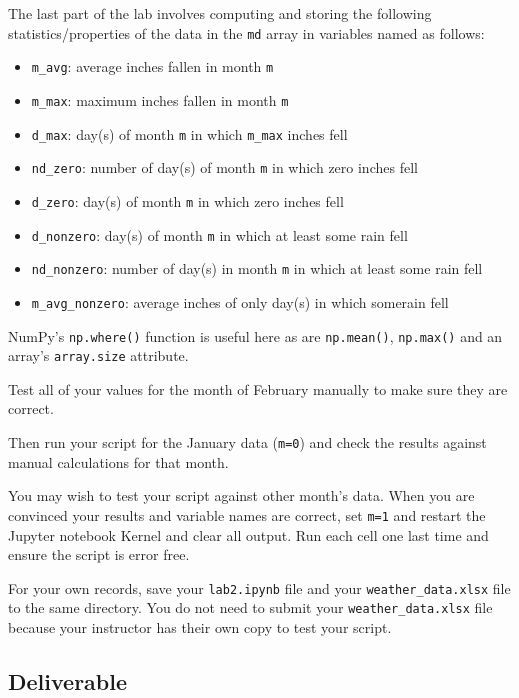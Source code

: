 \documentclass[11pt]{article}
\providecommand{\tightlist}{%
      \setlength{\itemsep}{0pt}\setlength{\parskip}{0pt}}
\begin{document}
The last part of the lab involves computing and storing the following
statistics/properties of the data in the \texttt{md} array in variables
named as follows:

\begin{itemize}
\tightlist
\item
  \texttt{m\_avg}: average inches fallen in month \texttt{m}
\item
  \texttt{m\_max}: maximum inches fallen in month \texttt{m}
\item
  \texttt{d\_max}: day(s) of month \texttt{m} in which \texttt{m\_max} inches fell
\item
  \texttt{nd\_zero}: number of day(s) of month \texttt{m} in which zero inches fell
\item
  \texttt{d\_zero}: day(s) of month \texttt{m} in which zero inches fell
\item
  \texttt{d\_nonzero}: day(s) of month \texttt{m} in which at least some rain fell
\item
  \texttt{nd\_nonzero}: number of day(s) in month \texttt{m} in which at least some rain fell
\item
  \texttt{m\_avg\_nonzero}: average inches of only day(s) in which somerain fell
\end{itemize}

NumPy's \texttt{np.where()} function is useful here as are
\texttt{np.mean()}, \texttt{np.max()} and an array's \texttt{array.size}
attribute.

    Test all of your values for the month of February manually to make sure
they are correct.

Then run your script for the January data (\texttt{m=0}) and check the
results against manual calculations for that month.

You may wish to test your script against other month's data. When you
are convinced your results and variable names are correct, set
\texttt{m=1} and restart the Jupyter notebook Kernel and clear all
output. Run each cell one last time and ensure the script is error free.

For your own records, save your \texttt{lab2.ipynb} file and your
\texttt{weather\_data.xlsx} file to the same directory. You do not need
to submit your \texttt{weather\_data.xlsx} file because your instructor
has their own copy to test your script.

    \hypertarget{deliverable}{%
\subsection{Deliverable}\label{deliverable}}
\end{document}
